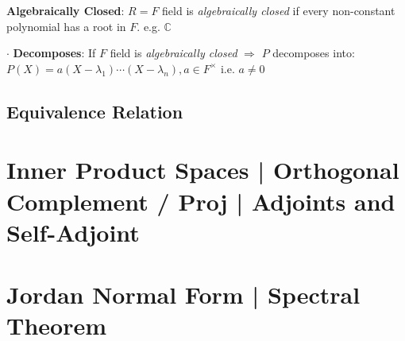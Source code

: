 \documentclass[9pt]{article}
\begin{document}
\textbf{Algebraically Closed}: $R=F$ field is \textit{algebraically closed} if every non-constant polynomial has a root in $F$. \qquad \qquad e.g. $\mathbb{C}$

$\cdot$ \textbf{Decomposes}: If $F$ field is \textit{algebraically closed} $\Rightarrow$ $P$ decomposes into: $P(X)=a(X-\lambda_1)\cdots(X-\lambda_n),a\in F^\times$ {\scriptsize i.e. $a\ne0$}


\subsection{Equivalence Relation}



\section{Inner Product Spaces | Orthogonal Complement / Proj | Adjoints and Self-Adjoint}


\section{Jordan Normal Form | Spectral Theorem}
\end{document}
